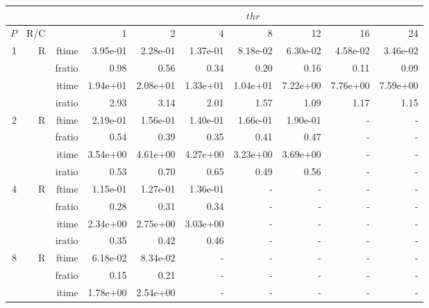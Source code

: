 \documentclass[a4paper]{article}
\begin{document}
\begin{table}[htbp]
\begin{center}
\begin{small}
\begin{tabular}{|r|r|r|r|r|r|r|r|r|r|}
\hline 
     & & & \multicolumn{7}{c|}{$thr$} \\ \hline
    $P$ & R/C &  & 1           & 2    & 4    & 8    & 12   & 16    & 24  \\ \hline\hline
     1 & R & ftime & 3.95e-01 & 2.28e-01 & 1.37e-01 & 8.18e-02 & 6.30e-02 & 4.58e-02 & 3.46e-02 \\   
          &      & fratio & 0.98 & 0.56 & 0.34 & 0.20 & 0.16 & 0.11 & 0.09 \\   
          &      & itime & 1.94e+01 & 2.08e+01 & 1.33e+01 & 1.04e+01 & 7.22e+00 & 7.76e+00 & 7.59e+00 \\   
          &      & iratio & 2.93 & 3.14 & 2.01 & 1.57 & 1.09 & 1.17 & 1.15 \\ \hline 
     2 & R & ftime & 2.19e-01 & 1.56e-01 & 1.40e-01 & 1.66e-01 & 1.90e-01 &     -     &     -     \\   
          &      & fratio & 0.54 & 0.39 & 0.35 & 0.41 & 0.47 &     -     &     -     \\   
          &      & itime & 3.54e+00 & 4.61e+00 & 4.27e+00 & 3.23e+00 & 3.69e+00 &     -     &     -     \\   
          &      & iratio & 0.53 & 0.70 & 0.65 & 0.49 & 0.56 &     -     &     -     \\ \hline 
     4 & R & ftime & 1.15e-01 & 1.27e-01 & 1.36e-01 &     -     &     -     &     -     &     -     \\   
          &      & fratio & 0.28 & 0.31 & 0.34 &     -     &     -     &     -     &     -     \\   
          &      & itime & 2.34e+00 & 2.75e+00 & 3.03e+00 &     -     &     -     &     -     &     -     \\   
          &      & iratio & 0.35 & 0.42 & 0.46 &     -     &     -     &     -     &     -     \\ \hline 
     8 & R & ftime & 6.18e-02 & 8.34e-02 &     -     &     -     &     -     &     -     &     -     \\   
          &      & fratio & 0.15 & 0.21 &     -     &     -     &     -     &     -     &     -     \\   
          &      & itime & 1.78e+00 & 2.54e+00 &     -     &     -     &     -     &     -     &     -     \\   

\end{tabular}
\end{small}
\end{center}
\end{table}
\end{document}

